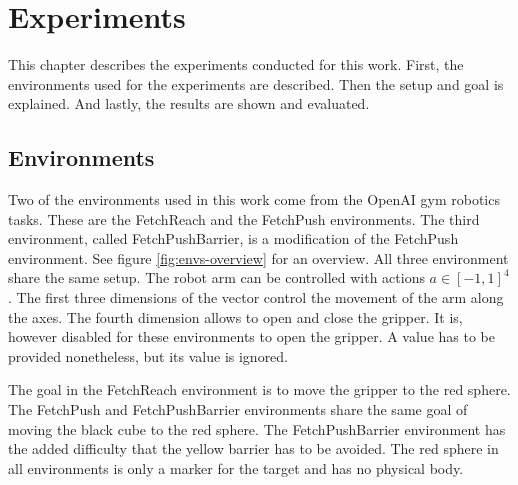 \chapter{Experiments}
\label{ch:experiments}

This chapter describes the experiments conducted for this work. First, the environments used for the experiments are described. Then the setup and goal is explained. And lastly, the results are shown and evaluated.

\section{Environments}
\label{sec:experiments:env}

Two of the environments used in this work come from the OpenAI gym robotics tasks. These are the FetchReach and the FetchPush environments. The third environment, called FetchPushBarrier, is a modification of the FetchPush environment. See figure \ref{fig:envs-overview} for an overview. All three environment share the same setup. The robot arm can be controlled with actions $a \in [-1,1]^4$. The first three dimensions of the vector control the movement of the arm along the axes. The fourth dimension allows to open and close the gripper. It is, however disabled for these environments to open the gripper. A value has to be provided nonetheless, but its value is ignored.

The goal in the FetchReach environment is to move the gripper to the red sphere. The FetchPush and FetchPushBarrier environments share the same goal of moving the black cube to the red sphere. The FetchPushBarrier environment has the added difficulty that the yellow barrier has to be avoided. The red sphere in all environments is only a marker for the target and has no physical body.

